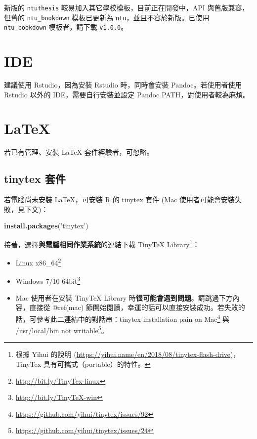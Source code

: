 \documentclass[oneside]{book}
\newenvironment{Shaded}{\begin{snugshade}}{\end{snugshade}}
\newcommand{\KeywordTok}[1]{\textcolor[rgb]{0.13,0.29,0.53}{\textbf{#1}}}
\newcommand{\NormalTok}[1]{#1}
\newcommand{\StringTok}[1]{\textcolor[rgb]{0.31,0.60,0.02}{#1}}
\renewcommand{\href}[2]{#2\footnote{\url{#1}}}
\providecommand{\tightlist}{%
  \setlength{\itemsep}{0pt}\setlength{\parskip}{0pt}}
\begin{document}
新版的 \texttt{ntuthesis} 較易加入其它學校模板，目前正在開發中，API 與舊版兼容，但舊的 \texttt{ntu\_bookdown} 模板已更新為 \texttt{ntu}，並且不容於新版。已使用 \texttt{ntu\_bookdown} 模板者，請下載 \texttt{v1.0.0}。

\hypertarget{ide-1}{%
\section{IDE}\label{ide-1}}

建議使用 Rstudio，因為安裝 Rstudio 時，同時會安裝 Pandoc。若使用者使用 Rstudio 以外的 IDE，需要自行安裝並設定 Pandoc PATH，對使用者較為麻煩。

\hypertarget{latex-1}{%
\section{LaTeX}\label{latex-1}}

若已有管理、安裝 LaTeX 套件經驗者，可忽略。

\hypertarget{tinytex-ux5957ux4ef6-1}{%
\subsection{tinytex 套件}\label{tinytex-ux5957ux4ef6-1}}

若電腦尚未安裝 LaTeX，可安裝 R 的 tinytex 套件 (Mac 使用者可能會安裝失敗，見下文)：

\begin{Shaded}
\begin{Highlighting}[]
\KeywordTok{install.packages}\NormalTok{(}\StringTok{'tinytex'}\NormalTok{)}
\end{Highlighting}
\end{Shaded}

接著，選擇\textbf{與電腦相同作業系統}的連結下載 TinyTeX Library\footnote{根據 Yihui 的說明 (\url{https://yihui.name/en/2018/08/tinytex-flash-drive})，TinyTex 具有可攜式（portable）的特性。}：

\begin{itemize}
\tightlist
\item
  \href{http://bit.ly/TinyTex-linux}{Linux x86\_64}
\item
  \href{http://bit.ly/TinyTeX-win}{Windows 7/10 64bit}
\item
  Mac 使用者在安裝 TinyTeX Library 時\textbf{很可能會遇到問題}。請跳過下方內容，直接從 @ref(mac) 節開始閱讀，幸運的話可以直接安裝成功。若失敗的話，可參考此二連結中的對話串：\href{https://github.com/yihui/tinytex/issues/92}{tinytex installation pain on Mac} 與 \href{https://github.com/yihui/tinytex/issues/24}{/usr/local/bin not writable}。
\end{itemize}
\end{document}
